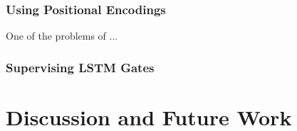 \documentclass[titlepage]{report}
\begin{document}
\subsection{Using Positional Encodings}

One of the problems of ...

\subsection{Supervising LSTM Gates}

\chapter{Discussion and Future Work}

\normalem
\printbibliography
\end{document}
